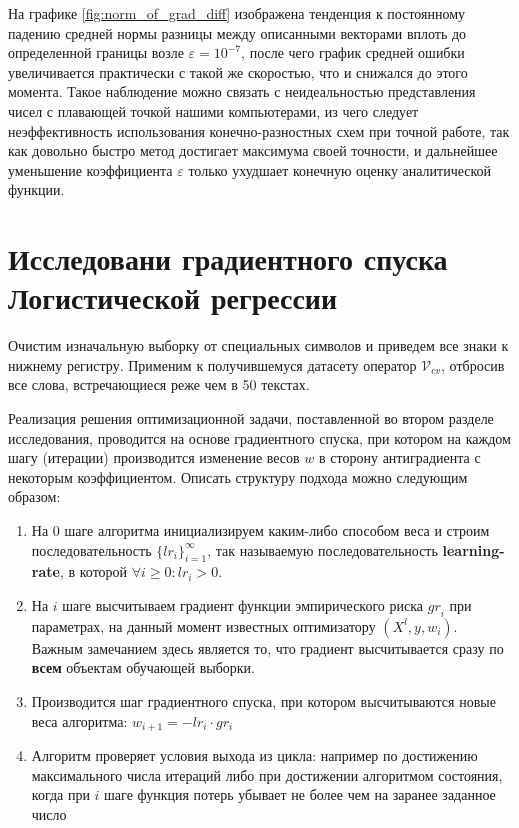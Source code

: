 \documentclass{article}
\begin{document}
    На графике \ref{fig:norm_of_grad_diff} изображена тенденция к постоянному падению средней  нормы разницы между описанными векторами вплоть до определенной границы возле $\varepsilon=10^{-7}$, после чего график средней ошибки увеличивается практически с такой же скоростью, что и снижался до этого момента. Такое наблюдение можно связать с неидеальностью представления чисел с плавающей точкой нашими компьютерами, из чего следует неэффективность использования конечно-разностных схем при точной работе, так как довольно быстро метод достигает максимума своей точности, и дальнейшее уменьшение коэффициента $\varepsilon$ только ухудшает конечную оценку аналитической функции. 

    
\section{Исследовани градиентного спуска Логистической регрессии}

    Очистим изначальную выборку от специальных символов и приведем все знаки к нижнему регистру. Применим к получившемуся датасету оператор $\mathcal{V}_{cv}$, отбросив все слова, встречающиеся реже чем в 50 текстах.
    
    Реализация решения оптимизационной задачи, поставленной во втором разделе исследования, проводится на основе градиентного спуска, при котором на каждом шагу (итерации) производится изменение весов $w$ в сторону антиградиента с некоторым коэффициентом. Описать структуру подхода можно следующим образом:

    \begin{enumerate}
        \item На $0$ шаге алгоритма инициализируем каким-либо способом веса и строим последовательность $\{{lr}_i\}_{i=1}^{\infty}$, так называемую последовательность \textbf{learning-rate}, в которой $\forall i \geqslant 0: {lr}_i > 0$.
        \item На $i$ шаге высчитываем градиент функции эмпирического риска ${gr}_i$ при параметрах, на данный момент известных оптимизатору $(X^l, y, w_i)$. Важным замечанием здесь является то, что градиент высчитывается сразу по \textbf{всем} объектам обучающей выборки.
        \item Производится шаг градиентного спуска, при котором высчитываются новые веса алгоритма: $w_{i+1}=- {lr}_i \cdot {gr_i}$
        \item Алгоритм проверяет условия выхода из цикла: например по достижению максимального числа итераций либо при достижении алгоритмом состояния, когда при $i$ шаге функция потерь убывает не более чем на заранее заданное число
    \end{enumerate}
\end{document}
